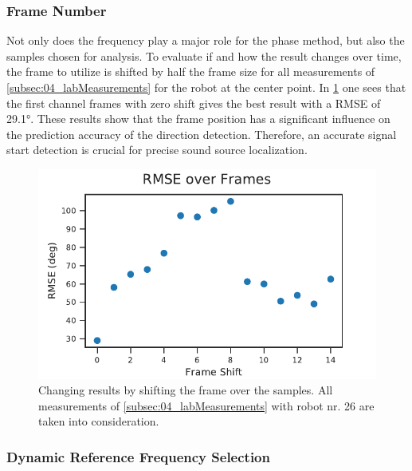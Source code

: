 \subsubsection*{Frame Number}
\label{subsubsec:04_frameNumber}

Not only does the frequency play a major role for the phase method,
but also the samples chosen for analysis.
To evaluate if and how the result changes over time, the frame to
utilize is shifted by half the frame size for all measurements
of \cref{subsec:04_labMeasurements} for the robot at the center
point.
In \cref{fig:04_phaseOverTime} one sees that the first channel frames with zero
shift gives the best result with a \ac{RMSE} of 29.1\si{\degree}. These results
show that the frame position has a significant influence on the prediction
accuracy of the direction detection. Therefore, an accurate signal start
detection is crucial for precise sound source localization.
\begin{figure}[ht]
	\centering
		\includegraphics[]{figures/evaluation/phase_over_time}
	\caption{Changing results by shifting the frame over the
	samples. All measurements of \cref{subsec:04_labMeasurements}
	with robot nr. 26 are taken into consideration.}
	\label{fig:04_phaseOverTime}
\end{figure}

\subsubsection*{Dynamic Reference Frequency Selection}

